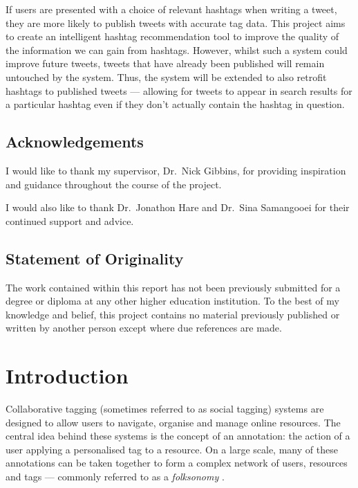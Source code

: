 \documentclass[11pt,a4paper]{report}
\begin{document}
If users are presented with a choice of relevant hashtags when writing a tweet, they are more likely to publish tweets with accurate tag data. This project aims to create an intelligent hashtag recommendation tool to improve the quality of the information we can gain from hashtags. However, whilst such a system could improve future tweets, tweets that have already been published will remain untouched by the system. Thus, the system will be extended to also retrofit hashtags to published tweets --- allowing for tweets to appear in search results for a particular hashtag even if they don't actually contain the hashtag in question.
\pagebreak

\tableofcontents

\pagebreak

\section*{Acknowledgements}
I would like to thank my supervisor, Dr.\ Nick Gibbins, for providing inspiration and guidance throughout the course of the project.

I would also like to thank Dr.\ Jonathon Hare and Dr.\ Sina Samangooei for their continued support and advice.

\section*{Statement of Originality}

The work contained within this report has not been previously submitted for a degree or diploma at any other higher education institution. To the best of my knowledge and belief, this project contains no material previously published or written by another person except where due references are made.

\pagebreak

\chapter{Introduction}
Collaborative tagging (sometimes referred to as social tagging) systems are designed to allow users to navigate, organise and manage online resources. The central idea behind these systems is the concept of an annotation: the action of a user applying a personalised tag to a resource. On a large scale, many of these annotations can be taken together to form a complex network of users, resources and tags --- commonly referred to as a \emph{folksonomy} \parencite{Xu:2008}.
\end{document}
